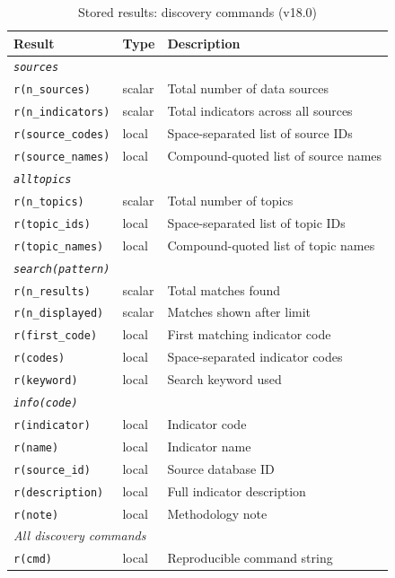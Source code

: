 \documentclass[bib]{statapress}
\begin{document}
\begin{table}[htbp]
\centering
\caption{Stored results: discovery commands (v18.0)}
\label{tab:stored-discovery}
\begin{tabular}{llp{6.5cm}}
\hline
Result & Type & Description \\
\hline
\multicolumn{3}{l}{\textit{\texttt{sources}}} \\
\texttt{r(n\_sources)} & scalar & Total number of data sources \\
\texttt{r(n\_indicators)} & scalar & Total indicators across all sources \\
\texttt{r(source\_codes)} & local & Space-separated list of source IDs \\
\texttt{r(source\_names)} & local & Compound-quoted list of source names \\
\hline
\multicolumn{3}{l}{\textit{\texttt{alltopics}}} \\
\texttt{r(n\_topics)} & scalar & Total number of topics \\
\texttt{r(topic\_ids)} & local & Space-separated list of topic IDs \\
\texttt{r(topic\_names)} & local & Compound-quoted list of topic names \\
\hline
\multicolumn{3}{l}{\textit{\texttt{search(pattern)}}} \\
\texttt{r(n\_results)} & scalar & Total matches found \\
\texttt{r(n\_displayed)} & scalar & Matches shown after limit \\
\texttt{r(first\_code)} & local & First matching indicator code \\
\texttt{r(codes)} & local & Space-separated indicator codes \\
\texttt{r(keyword)} & local & Search keyword used \\
\hline
\multicolumn{3}{l}{\textit{\texttt{info(code)}}} \\
\texttt{r(indicator)} & local & Indicator code \\
\texttt{r(name)} & local & Indicator name \\
\texttt{r(source\_id)} & local & Source database ID \\
\texttt{r(description)} & local & Full indicator description \\
\texttt{r(note)} & local & Methodology note \\
\hline
\multicolumn{3}{l}{\textit{All discovery commands}} \\
\texttt{r(cmd)} & local & Reproducible command string \\
\hline
\end{tabular}
\end{table}
\end{document}
